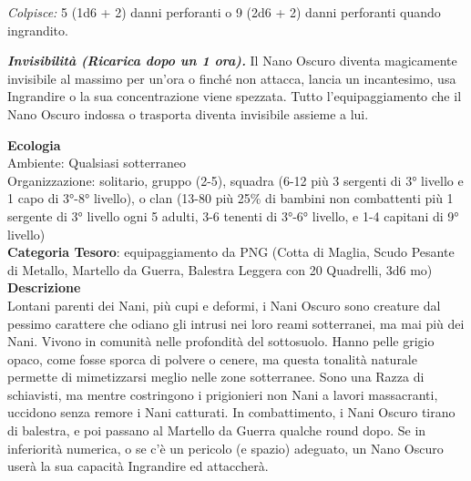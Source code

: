 \begin{multicols}{2}
{\emph{Colpisce:} 5 (1d6 + 2) danni perforanti o 9 (2d6 + 2) danni
perforanti quando ingrandito.

\emph{\textbf{Invisibilità (Ricarica dopo un 1 ora).}} Il Nano Oscuro diventa magicamente invisibile al massimo per un'ora o finché non attacca, lancia un incantesimo, usa Ingrandire o la sua concentrazione viene spezzata. Tutto l'equipaggiamento che il Nano Oscuro indossa o trasporta diventa invisibile assieme a lui.

\textbf{Ecologia}\\
Ambiente: Qualsiasi sotterraneo\\
Organizzazione: solitario, gruppo (2-5), squadra (6-12 più 3 sergenti di 3° livello e 1 capo di 3°-8° livello), o clan (13-80 più 25\% di bambini non combattenti più 1 sergente di 3° livello ogni 5 adulti, 3-6 tenenti di 3°-6° livello, e 1-4 capitani di 9° livello)\\
\textbf{Categoria Tesoro}: equipaggiamento da PNG (Cotta di Maglia, Scudo Pesante di Metallo, Martello da Guerra, Balestra Leggera con 20 Quadrelli, 3d6 mo)\\
\textbf{Descrizione}\\
Lontani parenti dei Nani, più cupi e deformi, i Nani Oscuro sono creature dal pessimo carattere che odiano gli intrusi nei loro reami sotterranei, ma mai più dei Nani. Vivono in comunità nelle profondità del sottosuolo. Hanno pelle grigio opaco, come fosse sporca di polvere o cenere, ma questa tonalità naturale permette di mimetizzarsi meglio nelle zone sotterranee. Sono una Razza di schiavisti, ma mentre costringono i prigionieri non Nani a lavori massacranti, uccidono senza remore i Nani catturati. In combattimento, i Nani Oscuro tirano di balestra, e poi passano al Martello da Guerra qualche round dopo. Se in inferiorità numerica, o se c'è un pericolo (e spazio) adeguato, un Nano Oscuro userà la sua capacità Ingrandire ed attaccherà.


}
\end{multicols}
